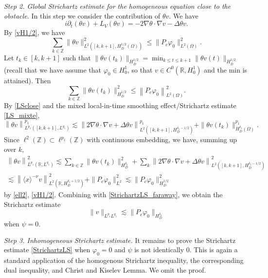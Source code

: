 \documentclass[10pt,leqno]{amsart}
\theoremstyle{definition}%
\theoremstyle{remark}
\numberwithin{equation}{section}
\newcommand{\R}{\mathbb{R}}
\newcommand{\Z}{\mathbb Z}
\renewcommand{\^}{\widehat}%
\newcommand{\la}{\langle}
\newcommand{\ra}{\rangle}
\begin{document}
\emph{Step 2. Global Strichartz estimate for the homogeneous equation close to the obstacle.}
In this step we consider the contribution of $\theta v$. We have 
\begin{equation}
 \label{LSclose}
 i\partial_t(\theta v)+L_V(\theta v)= -2\nabla\theta\cdot\nabla v-\Delta \theta v.
\end{equation} 
By \eqref{vH1/2}, we have 
$$ \sum_{k\in \Z} \|\theta v\|^2_{L^2\left([k,k+1],H_D^{1/2}(\Omega)\right)}\leq \|P_c\varphi_0\|^2_{L^2(\Omega)}.$$
Let $t_k\in [k,k+1]$ such that $\|\theta v(t_k)\|_{H_D^{1/2}}=\min_{k\leq t\leq k+1} \|\theta v(t)\|_{H_D^{1/2}}$ (recall that we have assume that $\varphi_0\in H^{1}_0$, so that $v\in C^0(\R,H^1_0)$ and the min is attained). Then
\begin{equation}
 \label{ell2}
 \sum_{k\in \Z} \|\theta v(t_k)\|^2_{H_D^{1/2}}\leq \left\|P_c \varphi_0\right\|^2_{L^2(\Omega)}.
\end{equation} 
By \eqref{LSclose} and the mixed local-in-time smoothing effect/Strichartz estimate \eqref{LS_mixte}, 
\begin{equation*}
\left\|\theta v\right\|_{L^{p_1}([k,k+1],L^{q_1})}^{p_1}\lesssim \left\|2\nabla\theta\cdot\nabla v+\Delta \theta v\right\|_{L^2([k,k+1],H^{\delta_1-1/2}_D)}^{p_1}+\|\theta v(t_k)\|^{p_1}_{H_D^{\delta_1}(\Omega)}.
\end{equation*}
Since $\ell^2(\Z)\subset\ell^{p_1}(\Z)$ with continuous embedding, we have, summing up over $k$, 
\begin{multline*}
\left\|\theta v\right\|_{L^{p_1}(\R,L^{q_1})}^2
\lesssim \sum_{k\in \Z}\|\theta v(t_k)\|^{2}_{H_D^{\delta_1}}+\sum_k \left\|2\nabla\theta\cdot\nabla v+\Delta \theta v\right\|_{L^2([k,k+1],H^{\delta_1-1/2}_D)}^2
\\
\lesssim \left\|\la x\ra^{-\nu}v\right\|_{L^2(\R,H^{\delta_1+1/2}_D)}^2+\|P_c\varphi_0\|_{L^2}^2\lesssim \|P_c\varphi_0\|_{H_D^{1/2}}^2
\end{multline*}
by \eqref{ell2}, \eqref{vH1/2}. Combining with \eqref{StrichartzLS_faraway}, we obtain the Strichartz estimate 
$$ \|v\|_{L^{p_1}L^{q_1}}\lesssim \|P_c\varphi_0\|_{H_D^{\delta_1}}$$
when $\psi=0$. 

\emph{Step 3. Inhomogeneous Strichartz estimate.} It remains to prove the Strichartz estimate \eqref{StrichartzLS} when $\varphi_0=0$ and $\psi$ is not identically $0$. This is again a standard application of the homogenous Strichartz inequality, the corresponding dual inequality, and  Christ and Kiselev Lemma. We omit the proof.
\end{document}
